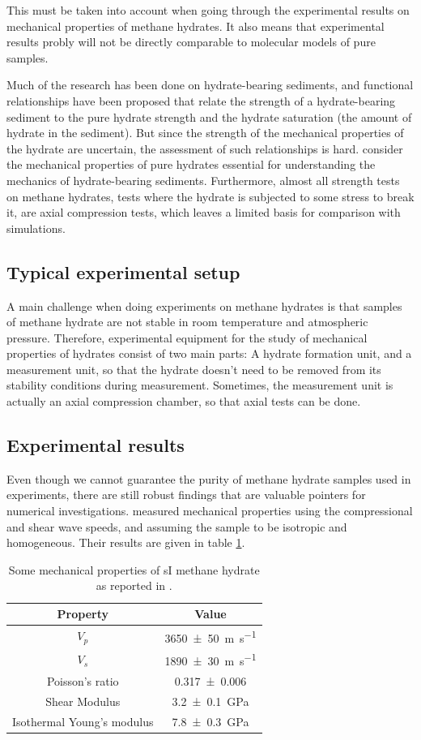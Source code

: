 This must be taken into account when going through the experimental results on mechanical properties of methane hydrates. It also means that experimental results probly will not be directly comparable to molecular models of pure samples.

Much of the research has been done on hydrate-bearing sediments, and functional relationships have been proposed that relate the strength of a hydrate-bearing sediment to the pure hydrate strength and the hydrate saturation (the amount of hydrate in the sediment). But since the strength of the mechanical properties of the hydrate are uncertain, the assessment of such relationships is hard. \citet{Ning2012} consider the mechanical properties of pure hydrates essential for understanding the mechanics of hydrate-bearing sediments. Furthermore, almost all strength tests on methane hydrates, tests where the hydrate is subjected to some stress to break it, are axial compression tests, which leaves a limited basis for comparison with simulations. 

\subsection{Typical experimental setup}
A main challenge when doing experiments on methane hydrates is that samples of methane hydrate are not stable in room temperature and atmospheric pressure. Therefore, experimental equipment for the study of mechanical properties of hydrates consist of two main parts: A hydrate formation unit, and a measurement unit, so that the hydrate doesn't need to be removed from its stability conditions during measurement. Sometimes, the measurement unit is actually an axial compression chamber, so that axial tests can be done.

\subsection{Experimental results}
Even though we cannot guarantee the purity of methane hydrate samples used in experiments, there are still robust findings that are valuable pointers for numerical investigations. \citet{Waite2000} measured mechanical properties using the compressional and shear wave speeds, and assuming the sample to be isotropic and homogeneous. Their results are given in table \ref{tbl:si_mech_exp}.

\begin{table}
\caption{Some mechanical properties of sI methane hydrate as reported in \cite{Waite2000}.}
\label{tbl:si_mech_exp}
\centering
\begin{tabular}{c|c}
Property & Value \\
\hline
$V_p$ & \SI{3650\pm 50}{\meter\per\second} \\
$V_s$ & \SI{1890\pm 30}{\meter\per\second} \\
Poisson's ratio & \SI{0.317 \pm 0.006}{} \\
Shear Modulus & \SI{3.2\pm0.1}{\giga\pascal} \\
Isothermal Young's modulus & \SI{7.8\pm 0.3}{\giga\pascal}
\end{tabular}
\end{table}

